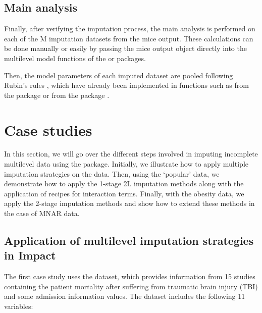 \documentclass[
  article]{jss}
\begin{document}
\subsection{Main analysis}\label{main-analysis}

Finally, after verifying the imputation process, the main analysis is
performed on each of the M imputation datasets from the mice output.
These calculations can be done manually or easily by passing the mice
output object directly into the multilevel model functions of the
 or  packages.

Then, the model parameters of each imputed dataset are pooled following
Rubin's rules \citep{rubin1987}, which have already been implemented in
 functions such as  from the 
package \citep{broom.mixed} or  from the 
package \citep{mitml2023}.

\section{Case studies}\label{sec-illustrations}

In this section, we will go over the different steps involved in
imputing incomplete multilevel data using the  package.
Initially, we illustrate how to apply multiple imputation strategies on
the  data. Then, using the `popular' data, we demonstrate
how to apply the 1-stage 2L imputation methods along with the
application of recipes for interaction terms. Finally, with the obesity
data, we apply the 2-stage imputation methods and show how to extend
these methods in the case of MNAR data.

\subsection{Application of multilevel imputation strategies in
Impact}\label{sec-2impact}

The first case study uses the  dataset, which provides
information from 15 studies containing the patient mortality after
suffering from traumatic brain injury (TBI) and some admission
information values. The dataset includes the following 11 variables:
\end{document}
